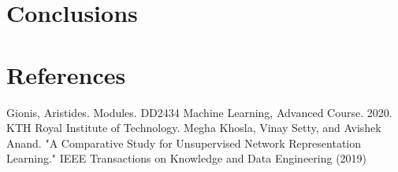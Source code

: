 \documentclass[a4paper]{article}
\begin{document}
\section{Conclusions}




\section{References}

\newpage{}
\begin{thebibliography}{1}
 Gionis, Aristides. Modules. DD2434 Machine Learning, Advanced Course. 2020. KTH Royal Institute of Technology.
 Megha Khosla, Vinay Setty, and Avishek Anand. "A Comparative Study for Unsupervised Network Representation Learning." IEEE Transactions on Knowledge and Data Engineering (2019)
\end{thebibliography}
\end{document}
